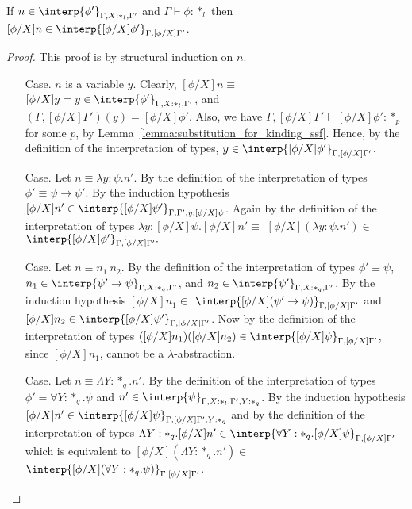 \begin{lemma}
  If $n \in \interp{\phi'}_{\Gamma,X:*_l,\Gamma'}$ and 
  $\Gamma \vdash \phi:*_l$ then 
  $[\phi/X]n \in \interp{[\phi/X]\phi'}_{\Gamma,[\phi/X]\Gamma'}$.
  \label{lemma:type_sub_ssf}
\end{lemma}
\begin{proof}
  This proof is by structural induction on $n$.
\begin{itemize}
\item[Case.] $n$ is a variable $y$.  Clearly, $[\phi/X]n \equiv $
  $[\phi/X]y = y \in \interp{\phi'}_{\Gamma,X:*_l,\Gamma'}$, and\\
  $(\Gamma,[\phi/X]\Gamma')(y) = [\phi/X]\phi'$. Also,
  we have $\Gamma,[\phi/X]\Gamma' \vdash [\phi/X]\phi':*_p$ for some $p$, by 
  Lemma~\ref{lemma:substitution_for_kinding_ssf}. Hence,
  by the definition of the interpretation of types, 
  $y \in \interp{[\phi/X]\phi'}_{\Gamma,[\phi/X]\Gamma'}$.
  
\item[Case.] Let $n \equiv \lambda y:\psi.n'$.  By the definition of the
  interpretation of types $\phi' \equiv \psi \rightarrow \psi'$.  
  By the induction hypothesis 
  $[\phi/X]n' \in \interp{[\phi/X]\psi'}_{\Gamma,\Gamma',y:[\phi/X]\psi}$. 
  Again by the definition of the interpretation of types
  $\lambda y:[\phi/X]\psi.[\phi/X]n' \equiv $
  $[\phi/X](\lambda y:\psi.n') \in $
  $\interp{[\phi/X]\phi'}_{\Gamma,[\phi/X]\Gamma'}.$
  
\item[Case.]  Let $n \equiv n_1\ n_2$.  By the definition of the 
  interpretation of types $\phi' \equiv \psi$, 
  $n_1 \in \interp{\psi' \rightarrow \psi}_{\Gamma,X:*_q,\Gamma'}$, and
  $n_2 \in \interp{\psi'}_{\Gamma,X:*_q,\Gamma'}$.  By the induction hypothesis 
  $[\phi/X]n_1 \in $
  $\interp{[\phi/X](\psi' \rightarrow \psi)}_{\Gamma,[\phi/X]\Gamma'}$ and
  $[\phi/X]n_2 \in \interp{[\phi/X]\psi'}_{\Gamma,[\phi/X]\Gamma'}$.  Now by
  the definition of the interpretation of types 
  $([\phi/X]n_1)([\phi/X]n_2) \in \interp{[\phi/X]\psi}_{\Gamma,[\phi/X]\Gamma'}$,
  since $[\phi/X]n_1$, cannot be a $\lambda$-abstraction.
  
\item[Case.]  Let $n \equiv \Lambda Y:*_q.n'$.  By the definition of the
  interpretation of types $\phi' = \forall Y:*_q.\psi$ and 
  $n' \in \interp{\psi}_{\Gamma,X:*_l,\Gamma',Y:*_q}$.  By the induction 
  hypothesis \\
  $[\phi/X]n' \in \interp{[\phi/X]\psi}_{\Gamma,[\phi/X]\Gamma',Y:*_q}$ and by
  the definition of the interpretation of types 
  $\Lambda Y:*_q.[\phi/X]n' \in 
  \interp{\forall Y:*_q.[\phi/X]\psi}_{\Gamma,[\phi/X]\Gamma'}$ which is 
  equivalent to
  $[\phi/X](\Lambda Y:*_q.n') \in $
  $\interp{[\phi/X](\forall Y:*_q.\psi)}_{\Gamma,[\phi/X]\Gamma'}$.
  

\end{itemize}
\end{proof}
